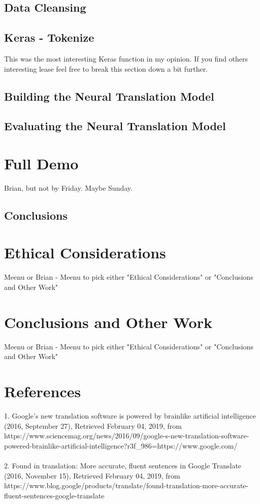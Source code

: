 \documentclass{llncs}
\begin{document}
\subsection{Data Cleansing}

\subsection{Keras - Tokenize}
This was the most interesting Keras function in my opinion. If you find others interesting lease feel free to break this section down a bit further.

\subsection{Building the Neural Translation Model}

\subsection{Evaluating the Neural Translation Model}

\section{Full Demo}
Brian, but not by Friday. Maybe Sunday.

\subsection{Conclusions}

\section{Ethical Considerations}
 Meenu or Brian - Meenu to pick either "Ethical Considerations" or "Conclusions and Other Work"


\section{Conclusions and Other Work}
 Meenu or Brian - Meenu to pick either "Ethical Considerations" or "Conclusions and Other Work"


\section{References}
1.	Google’s new translation software is powered by brainlike artificial intelligence (2016, September 27),  Retrieved February 04, 2019, from 
https://www.sciencemag.org/news/2016/09/google-s-new-translation-software-powered-brainlike-artificial-intelligence?r3f\_986=https://www.google.com/
\\
\\
2.	Found in translation: More accurate, fluent sentences in Google Translate (2016, November 15),  Retrieved February 04, 2019, from https://www.blog.google/products/translate/found-translation-more-accurate-fluent-sentences-google-translate
\end{document}
